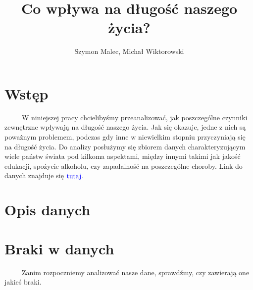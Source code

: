 \documentclass[
]{article}
\title{Co wpływa na długość naszego życia?}
\author{Szymon Malec, Michał Wiktorowski}
\date{}
\begin{document}
\maketitle

\raggedbottom

\hypertarget{wstux119p}{%
\section{Wstęp}\label{wstux119p}}

~~~~~W niniejszej pracy chcielibyśmy przeanalizować, jak poszczególne
czynniki zewnętrzne wpływają na długość naszego życia. Jak się okazuje,
jedne z nich są poważnym problemem, podczas gdy inne w niewielkim
stopniu przyczyniają się na długość życia. Do analizy posłużymy się
zbiorem danych charakteryzującym wiele państw świata pod kilkoma
aspektami, między innymi takimi jak jakość edukacji, spożycie alkoholu,
czy zapadalność na poszczególne choroby. Link do danych znajduje się
\href{https://www.kaggle.com/datasets/kumarajarshi/life-expectancy-who?fbclid=IwAR2HtwUPyioM4tHmuae7B2owTUB8q3XlmpP12LbTM9NYDsi4qtaWGOYoNDE}{\(\color{blue}{\text{tutaj}}\)}.

\hypertarget{opis-danych}{%
\section{Opis danych}\label{opis-danych}}

\hypertarget{braki-w-danych}{%
\section{Braki w danych}\label{braki-w-danych}}

~~~~~Zanim rozpoczniemy analizować nasze dane, sprawdźmy, czy zawierają
one jakieś braki.
\end{document}

